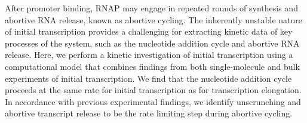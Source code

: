 After promoter binding, RNAP may engage in repeated rounds of synthesis and
abortive RNA release, known as abortive cycling. The inherently unstable
nature of initial transcription provides a challenging for extracting kinetic
data of key processes of the system, such as the nucleotide addition cycle and
abortive RNA release. Here, we perform a kinetic investigation of initial
transcription using a computational model that combines findings from both
single-molecule and bulk experiments of initial transcription. We find that
the nucleotide addition cycle proceeds at the same rate for initial
transcription as for transcription elongation. In accordance with previous
experimental findings, we identify unscrunching and abortive transcript
release to be the rate limiting step during abortive cycling.
